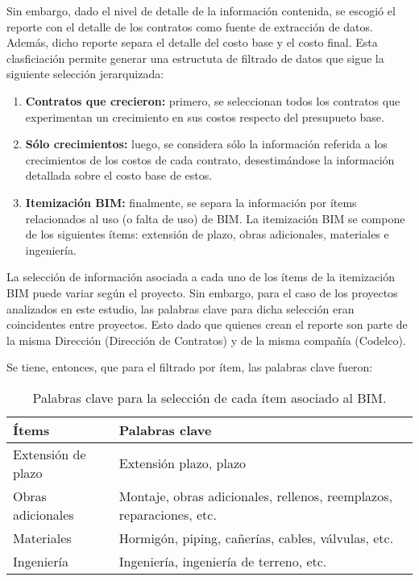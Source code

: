 Sin embargo, dado el nivel de detalle de la información contenida, se escogió el reporte con el detalle de los contratos como fuente de extracción de datos. Además, dicho reporte separa el detalle del costo base y el costo final. Esta clasficiación permite generar una estructuta de filtrado de datos que sigue la siguiente selección jerarquizada:

\begin{enumerate}
    \item \textbf{Contratos que crecieron:} primero, se seleccionan todos los contratos que experimentan un crecimiento en sus costos respecto del presupueto base.
    
    \item \textbf{Sólo crecimientos:} luego, se considera sólo la información referida a los crecimientos de los costos de cada contrato, desestimándose la información detallada sobre el costo base de estos.
    
    \item \textbf{Itemización BIM:} finalmente, se separa la información por ítems relacionados al uso (o falta de uso) de BIM. La itemización BIM se compone de los siguientes ítems: extensión de plazo, obras adicionales, materiales e ingeniería.
\end{enumerate}

La selección de información asociada a cada uno de los ítems de la itemización BIM puede variar según el proyecto. Sin embargo, para el caso de los proyectos analizados en este estudio, las palabras clave para dicha selección eran coincidentes entre proyectos. Esto dado que quienes crean el reporte son parte de la misma Dirección (Dirección de Contratos) y de la misma compañía (Codelco). 

Se tiene, entonces, que para el filtrado por ítem, las palabras clave fueron:

\begin{table}[H]
    \centering
    \caption{Palabras clave para la selección de cada ítem asociado al BIM.}
    \label{tab.keyw}
    \begin{tabular}{ll}
        \toprule
        \textbf{Ítems} & \textbf{Palabras clave} \\
        \midrule
        Extensión de plazo & Extensión plazo, plazo\\
        Obras adicionales & Montaje, obras adicionales, rellenos, reemplazos, reparaciones, etc.\\
        Materiales & Hormigón, piping, cañerías, cables, válvulas, etc. \\
        Ingeniería & Ingeniería, ingeniería de terreno, etc. \\
        \bottomrule
    \end{tabular}
\end{table}

